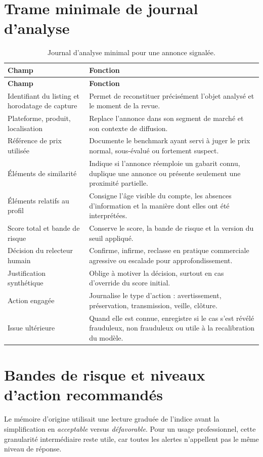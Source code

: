 \documentclass[10pt,a4paper]{article}
\begin{document}
\newpage

\section{Trame minimale de journal d'analyse}
\begin{longtable}{p{4.2cm} p{11.0cm}}
\caption{Journal d'analyse minimal pour une annonce signalée.}\\
\toprule
\textbf{Champ} & \textbf{Fonction} \\
\midrule
\endfirsthead
\toprule
\textbf{Champ} & \textbf{Fonction} \\
\midrule
\endhead
Identifiant du listing et horodatage de capture & Permet de reconstituer précisément l'objet analysé et le moment de la revue. \\
Plateforme, produit, localisation & Replace l'annonce dans son segment de marché et son contexte de diffusion. \\
Référence de prix utilisée & Documente le benchmark ayant servi à juger le prix normal, sous-évalué ou fortement suspect. \\
Éléments de similarité & Indique si l'annonce réemploie un gabarit connu, duplique une annonce ou présente seulement une proximité partielle. \\
Éléments relatifs au profil & Consigne l'âge visible du compte, les absences d'information et la manière dont elles ont été interprétées. \\
Score total et bande de risque & Conserve le score, la bande de risque et la version du seuil appliqué. \\
Décision du relecteur humain & Confirme, infirme, reclasse en pratique commerciale agressive ou escalade pour approfondissement. \\
Justification synthétique & Oblige à motiver la décision, surtout en cas d'override du score initial. \\
Action engagée & Journalise le type d'action : avertissement, préservation, transmission, veille, clôture. \\
Issue ultérieure & Quand elle est connue, enregistre si le cas s'est révélé frauduleux, non frauduleux ou utile à la recalibration du modèle. \\
\bottomrule
\end{longtable}

\newpage

\section{Bandes de risque et niveaux d'action recommandés}
Le mémoire d'origine utilisait une lecture graduée de l'indice avant la simplification en \emph{acceptable} versus \emph{défavorable}. Pour un usage professionnel, cette granularité intermédiaire reste utile, car toutes les alertes n'appellent pas le même niveau de réponse.
\end{document}

